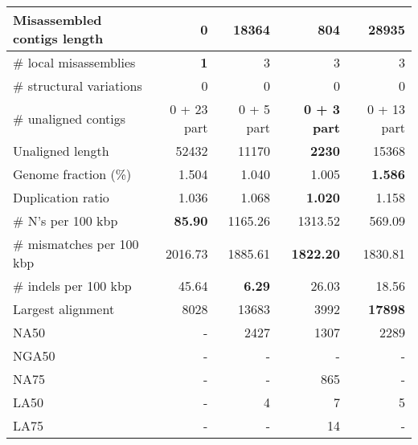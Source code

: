 \documentclass[12pt,a4paper]{article}
\begin{document}
\begin{table}[ht]
\begin{center}
\begin{tabular}{|l*{4}{|r}|}
Misassembled contigs length & {\bf 0} & 18364 & 804 & 28935 \\ \hline
\# local misassemblies & {\bf 1} & 3 & 3 & 3 \\ \hline
\# structural variations & 0 & 0 & 0 & 0 \\ \hline
\# unaligned contigs & 0 + 23 part & 0 + 5 part & {\bf 0 + 3 part} & 0 + 13 part \\ \hline
Unaligned length & 52432 & 11170 & {\bf 2230} & 15368 \\ \hline
Genome fraction (\%) & 1.504 & 1.040 & 1.005 & {\bf 1.586} \\ \hline
Duplication ratio & 1.036 & 1.068 & {\bf 1.020} & 1.158 \\ \hline
\# N's per 100 kbp & {\bf 85.90} & 1165.26 & 1313.52 & 569.09 \\ \hline
\# mismatches per 100 kbp & 2016.73 & 1885.61 & {\bf 1822.20} & 1830.81 \\ \hline
\# indels per 100 kbp & 45.64 & {\bf 6.29} & 26.03 & 18.56 \\ \hline
Largest alignment & 8028 & 13683 & 3992 & {\bf 17898} \\ \hline
NA50 & - & 2427 & 1307 & 2289 \\ \hline
NGA50 & - & - & - & - \\ \hline
NA75 & - & - & 865 & - \\ \hline
LA50 & - & 4 & 7 & 5 \\ \hline
LA75 & - & - & 14 & - \\ \hline
\end{tabular}
\end{center}
\end{table}
\end{document}
